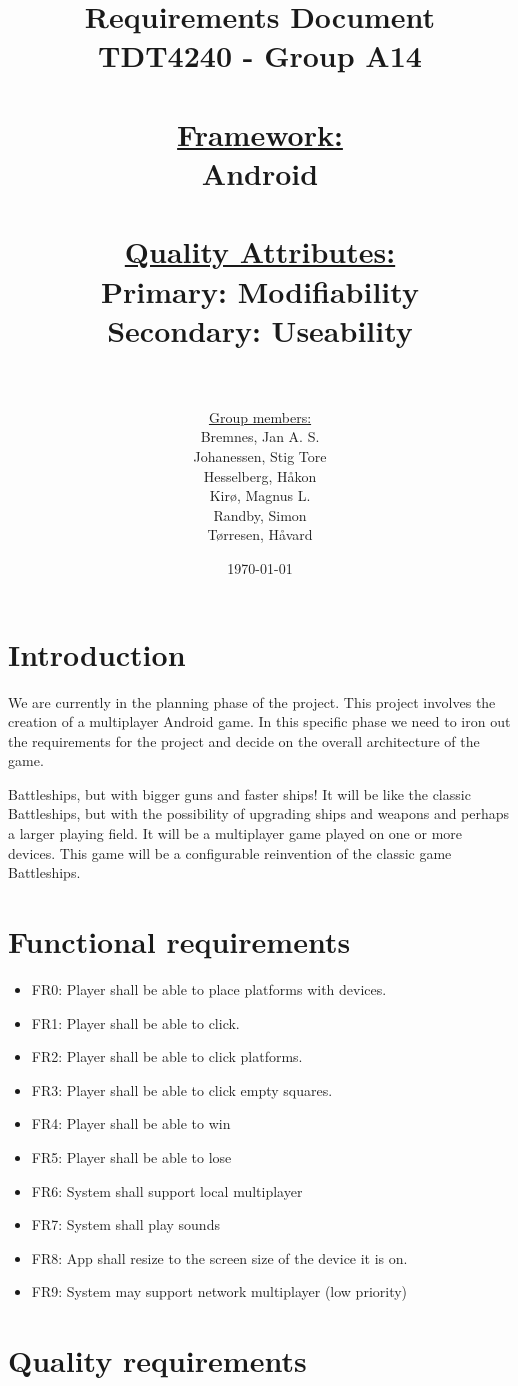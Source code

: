\documentclass[12pt, a4paper]{article}
\title{
	Requirements Document \\
    TDT4240 - Group A14 \\
	~\\
	\normalsize{
	\underline{Framework:} \\ 
	Android\\
    ~\\
	\underline{Quality Attributes:} \\
	Primary: Modifiability \\
	Secondary: Useability \\ 
    ~\\
	}
}
\author{
	\underline{Group members:} \\
    Bremnes, Jan A. S.\\
    Johanessen, Stig Tore\\
	Hesselberg, Håkon \\
    Kirø, Magnus L.\\
	Randby, Simon \\
    Tørresen, Håvard\\
}
\date{\today}
\begin{document}
\maketitle
{}

\newpage
\tableofcontents
\newpage

\section{Introduction}
We are currently in the planning phase of the project. This project involves the creation of a multiplayer Android game. In this specific phase we need to iron out the requirements for the project and decide on the overall architecture of the game.

Battleships, but with bigger guns and faster ships! It will be like the classic Battleships, but with the possibility of upgrading ships and weapons and perhaps a larger playing field. It will be a multiplayer game played on one or more devices.
This game will be a configurable reinvention of the classic game Battleships.


\section{Functional requirements}
\begin{itemize}
\item FR0: Player shall be able to place platforms with devices.
\item FR1: Player shall be able to click.
\item FR2: Player shall be able to click platforms.
\item FR3: Player shall be able to click empty squares. 
\item FR4: Player shall be able to win 
\item FR5: Player shall be able to lose
\item FR6: System shall support local multiplayer
\item FR7: System shall play sounds
\item FR8: App shall resize to the screen size of the device it is on.
\item FR9: System may support network multiplayer (low priority)
\end{itemize}

\section{Quality requirements}
\end{document}
